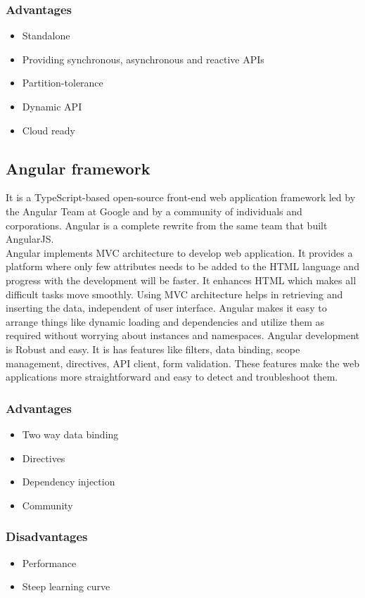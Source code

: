 \documentclass[a4paper, hidelinks, 12pt]{report}
\begin{document}
\subsubsection{Advantages}
\begin{itemize}
\item{} Standalone
\item{} Providing synchronous, asynchronous and reactive APIs
\item{} Partition-tolerance
\item{} Dynamic API
\item{} Cloud ready
\end{itemize}

\subsection{Angular framework}
It is a TypeScript-based open-source front-end web application framework led by the Angular Team at Google and by a community of individuals and corporations. Angular is a complete rewrite from the same team that built AngularJS.\\

Angular implements MVC architecture to develop web application. It provides a platform where only few attributes needs to be added to the HTML language and progress with the development will be faster. It enhances HTML which makes all difficult tasks move smoothly. Using MVC architecture helps in retrieving and inserting the data, independent of user interface. Angular makes it easy to arrange things like dynamic loading and dependencies and utilize them as required without worrying about instances and namespaces. Angular development is Robust and easy. It is has features like filters, data binding, scope management, directives, API client, form validation. These features make the web applications more straightforward and easy to detect and troubleshoot them.
\subsubsection{Advantages}
\begin{itemize}
\item{} Two way data binding
\item{} Directives
\item{} Dependency injection
\item{} Community
\end{itemize}
\subsubsection{Disadvantages}
\begin{itemize}
\item{} Performance
\item{} Steep learning curve

\end{itemize}
\end{document}
